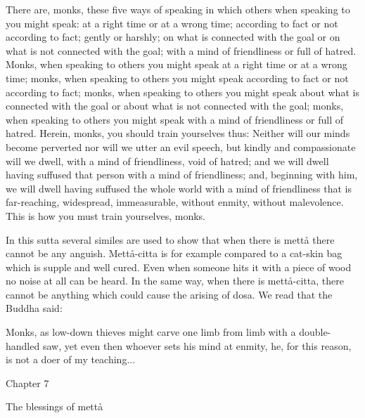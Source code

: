 \documentclass[12pt,twoside]{article}
\begin{document}
\bigskip

There are, monks, these five ways of speaking in which others when
speaking to you might speak: at a right time or at a wrong time;
according to fact or not according to fact; gently or harshly; on what
is connected with the goal or on what is not connected with the goal;
with a mind of friendliness or full of hatred. Monks, when speaking to
others you might speak at a right time or at a wrong time; monks, when
speaking to others you might speak according to fact or not according
to fact; monks, when speaking to others you might speak about what is
connected with the goal or about what is not connected with the goal;
monks, when speaking to others you might speak with a mind of
friendliness or full of hatred. Herein, monks, you should train
yourselves thus: {\textasciigrave}{\textasciigrave}Neither will our
minds become perverted nor will we utter an evil speech, but kindly and
compassionate will we dwell, with a mind of friendliness, void of
hatred; and we will dwell having suffused that person with a mind of
friendliness; and, beginning with him, we will dwell having suffused
the whole world with a mind of friendliness that is far{}-reaching,
widespread, immeasurable, without enmity, without
malevolence.{\textquotesingle}{\textquotesingle} This is how you must
train yourselves, monks. 


\bigskip


\bigskip

In this sutta several similes are used to show that when there is
mett{\aa} there cannot be any anguish. Mett{\aa}{}-citta is for example
compared to a cat{}-skin bag which is supple and well cured. Even when
someone hits it with a piece of wood no noise at all can be heard. In
the same way, when there is mett{\aa}{}-citta, there cannot be anything
which could cause the arising of dosa. We read that the Buddha said:


\bigskip

Monks, as low{}-down thieves might carve one limb from limb with a
double{}-handled saw, yet even then whoever sets his mind at enmity,
he, for this reason, is not a doer of my teaching...


\bigskip


\bigskip

\clearpage
Chapter 7


\bigskip


\bigskip

The blessings of mett{\aa}


\bigskip
\end{document}
